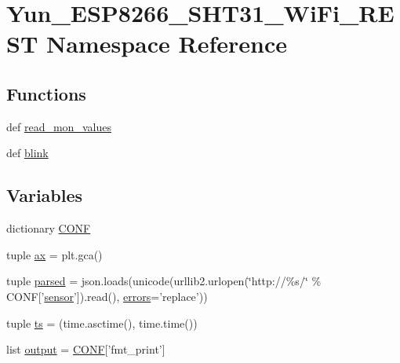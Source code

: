 \hypertarget{namespaceYun__ESP8266__SHT31__WiFi__REST}{\section{Yun\-\_\-\-E\-S\-P8266\-\_\-\-S\-H\-T31\-\_\-\-Wi\-Fi\-\_\-\-R\-E\-S\-T Namespace Reference}
\label{namespaceYun__ESP8266__SHT31__WiFi__REST}
}
\subsection*{Functions}
\begin{DoxyCompactItemize}
\item 
def \hyperlink{namespaceYun__ESP8266__SHT31__WiFi__REST_a8847b2476110503adebd4cea70d12f5d}{read\-\_\-mon\-\_\-values}
\item 
def \hyperlink{namespaceYun__ESP8266__SHT31__WiFi__REST_afe6d2e7a279452543e18afc34d1e3114}{blink}
\end{DoxyCompactItemize}
\subsection*{Variables}
\begin{DoxyCompactItemize}
\item 
dictionary \hyperlink{namespaceYun__ESP8266__SHT31__WiFi__REST_a8d61ec095672a28e3d0baecb0c409e29}{C\-O\-N\-F}
\item 
tuple \hyperlink{namespaceYun__ESP8266__SHT31__WiFi__REST_a0e6142681b435132cacefd1f0c8e32bf}{ax} = plt.\-gca()
\item 
tuple \hyperlink{namespaceYun__ESP8266__SHT31__WiFi__REST_a46b22ae14dfeb87a7f7a7d7a2bbe79ab}{parsed} = json.\-loads(unicode(urllib2.\-urlopen(\char`\"{}http\-://\%s/\char`\"{} \% C\-O\-N\-F\mbox{[}'\hyperlink{Tiny__OWSlave__OWH__DS18B20__thermo-hygrometer_8ino_abdb2aa4e7ca4f99842081342ca9d8830}{sensor}'\mbox{]}).read(), \hyperlink{General__Stuff_8h_a88ca701b8d18d701c67f6d23b3174487}{errors}='replace'))
\item 
tuple \hyperlink{namespaceYun__ESP8266__SHT31__WiFi__REST_a7770630e75551836c5d8dc48c3321a6a}{ts} = (time.\-asctime(), time.\-time())
\item 
list \hyperlink{namespaceYun__ESP8266__SHT31__WiFi__REST_acb18c36bfe11f9d6ae35ec9914ff386f}{output} = \hyperlink{namespaceYun__ESP8266__SHT31__WiFi__REST_a8d61ec095672a28e3d0baecb0c409e29}{C\-O\-N\-F}\mbox{[}'fmt\-\_\-print'\mbox{]}
\end{DoxyCompactItemize}


